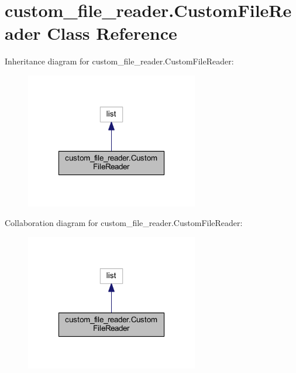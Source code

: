 \hypertarget{classcustom__file__reader_1_1_custom_file_reader}{\section{custom\-\_\-file\-\_\-reader.\-Custom\-File\-Reader Class Reference}
\label{classcustom__file__reader_1_1_custom_file_reader}
}


Inheritance diagram for custom\-\_\-file\-\_\-reader.\-Custom\-File\-Reader\-:
\nopagebreak
\begin{figure}[H]
\begin{center}
\leavevmode
\includegraphics[width=214pt]{classcustom__file__reader_1_1_custom_file_reader__inherit__graph}
\end{center}
\end{figure}


Collaboration diagram for custom\-\_\-file\-\_\-reader.\-Custom\-File\-Reader\-:
\nopagebreak
\begin{figure}[H]
\begin{center}
\leavevmode
\includegraphics[width=214pt]{classcustom__file__reader_1_1_custom_file_reader__coll__graph}
\end{center}
\end{figure}
